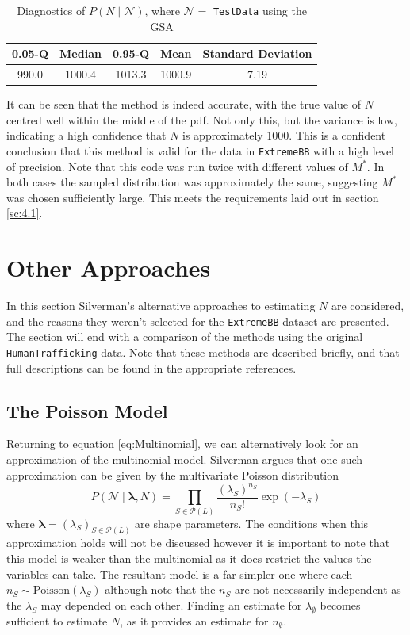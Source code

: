 \documentclass[10pt,a4paper,notitlepage]{article}
\begin{document}
\begin{table}[H]
\centering
\begin{tabular}{|ccc|cc|}
\hline 0.05-Q &Median & 0.95-Q& Mean & Standard Deviation\\
\hline  990.0 & 1000.4 & 1013.3 & 1000.9 & 7.19\\
\hline
\end{tabular}
\caption{Diagnostics of $P(N\mid \mathcal{N})$, where $\mathcal{N}=$ \texttt{TestData} using the GSA}\label{tb:SimQUANT}
\end{table}
It can be seen that the method is indeed accurate, with the true value of $N$ centred well within the middle of the pdf. Not only this, but the variance is low, indicating a high confidence that $N$ is approximately 1000. This is a confident conclusion that this method is valid for the data in \texttt{ExtremeBB} with a high level of precision. Note that this code was run twice with different values of $M^{*}$. In both cases the sampled distribution was approximately the same, suggesting $M^{*}$ was chosen sufficiently large. This meets the requirements laid out in section \ref{sc:4.1}.

\section{Other Approaches}\label{sc:5}
In this section Silverman's alternative approaches to estimating $N$ are considered, and the reasons they weren't selected for the \texttt{ExtremeBB} dataset are presented. The section will end with a comparison of the methods using the original \texttt{HumanTrafficking} data. Note that these methods are described briefly, and that full descriptions can be found in the appropriate references.

\subsection{The Poisson Model}
Returning to equation \eqref{eq:Multinomial}, we can alternatively look for an approximation of the multinomial model. Silverman argues that one such approximation can be given by the multivariate Poisson distribution
\begin{equation}
P(\mathcal{N} \mid \bm{\lambda}, N)=\prod_{S\in \mathcal{P}(L)}\frac{(\lambda_{S})^{n_{S}}}{n_{S}!}\exp\left(-\lambda_{S}\right)
\end{equation}
where $\bm{\lambda}=\left(\lambda_{S}\right)_{S\in\mathcal{P}(L)}$ are shape parameters. The conditions when this approximation holds will not be discussed however it is important to note that this model is weaker than the multinomial as it does restrict the values the variables can take. The resultant model is a far simpler one where each $n_{S}\sim\text{Poisson}(\lambda_{S})$ although note that the $n_{S}$ are not necessarily independent as the $\lambda_{S}$ may depended on each other. Finding an estimate for $\lambda_{\emptyset}$ becomes sufficient to estimate $N$, as it provides an estimate for $n_{\emptyset}$.
\end{document}
